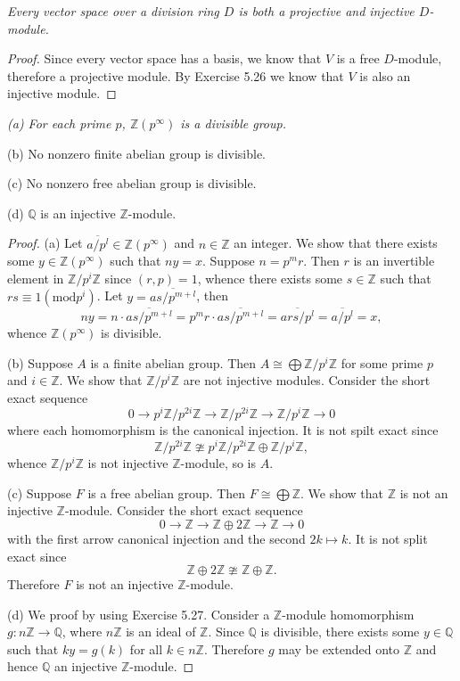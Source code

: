 \begin{problem}\em
Every vector space over a division ring $D$ is both a projective and injective $D$-module.
\end{problem}
\begin{proof}
Since every vector space has a basis, we know that $V$ is a free $D$-module, therefore a projective module. By Exercise 5.26 we know that $V$ is also an injective module.
\end{proof}
\begin{problem}\em
(a) For each prime $p$, $\mathbb{Z}(p^\infty)$ is a divisible group.\par
(b) No nonzero finite abelian group is divisible.\par
(c) No nonzero free abelian group is divisible.\par
(d) $\mathbb{Q}$ is an injective $\mathbb{Z}$-module.
\end{problem}
\begin{proof}
(a) Let $\overline{a/p^l}\in\mathbb{Z}(p^\infty)$ and $n\in\mathbb{Z}$ an integer. We show that there exists some $y\in\mathbb{Z}(p^\infty)$ such that $ny=x$. Suppose $n=p^mr$. Then $r$ is an invertible element in $\mathbb{Z}/p^i\mathbb{Z}$ since $(r,p)=1$, whence there exists some $s\in\mathbb{Z}$ such that $rs\equiv 1(\mathrm{mod}p^i)$. Let $y=\overline{as/p^{m+l}}$, then 
$$
ny=n\cdot \overline{as/p^{m+l}}=p^mr\cdot \overline{as/p^{m+l}}=\overline{ars/p^l}=\overline{a/p^l}=x,
$$
whence $\mathbb{Z}(p^\infty)$ is divisible.\par
(b) Suppose $A$ is a finite abelian group. Then $A\cong\bigoplus\mathbb{Z}/p^i\mathbb{Z}$ for some prime $p$ and $i\in\mathbb{Z}$. We show that $\mathbb{Z}/p^i\mathbb{Z}$ are not injective modules. Consider the short exact sequence 
$$
0\longrightarrow p^i\mathbb{Z} /p^{2i}\mathbb{Z} \longrightarrow \mathbb{Z} /p^{2i}\mathbb{Z} \longrightarrow \mathbb{Z} /p^i\mathbb{Z} \longrightarrow 0
$$
where each homomorphism is the canonical injection. It is not spilt exact since 
$$
\mathbb{Z} /p^{2i}\mathbb{Z} \ncong p^i\mathbb{Z} /p^{2i}\mathbb{Z} \oplus \mathbb{Z} /p^i\mathbb{Z} ,
$$
whence $\mathbb{Z}/p^i\mathbb{Z}$ is not injective $\mathbb{Z}$-module, so is $A$.\par
(c) Suppose $F$ is a free abelian group. Then $F\cong\bigoplus\mathbb{Z}$. We show that $\mathbb{Z}$ is not an injective $\mathbb{Z}$-module. Consider the short exact sequence 
$$
0\longrightarrow \mathbb{Z} \longrightarrow \mathbb{Z} \oplus 2\mathbb{Z} \longrightarrow \mathbb{Z} \longrightarrow 0
$$
with the first arrow canonical injection and the second $2k\mapsto k$. It is not split exact since 
$$
\mathbb{Z} \oplus 2\mathbb{Z} \ncong \mathbb{Z} \oplus \mathbb{Z} .
$$
Therefore $F$ is not an injective $\mathbb{Z}$-module.\par
(d) We proof by using Exercise 5.27. Consider a $\mathbb{Z}$-module homomorphism $g:n\mathbb{Z}\to\mathbb{Q}$, where $n\mathbb{Z}$ is an ideal of $\mathbb{Z}$. Since $\mathbb{Q}$ is divisible, there exists some $y\in\mathbb{Q}$ such that $ky=g(k)$ for all $k\in n\mathbb{Z}$. Therefore $g$ may be extended onto $\mathbb{Z}$ and hence $\mathbb{Q}$ an injective $\mathbb{Z}$-module.
\end{proof}
